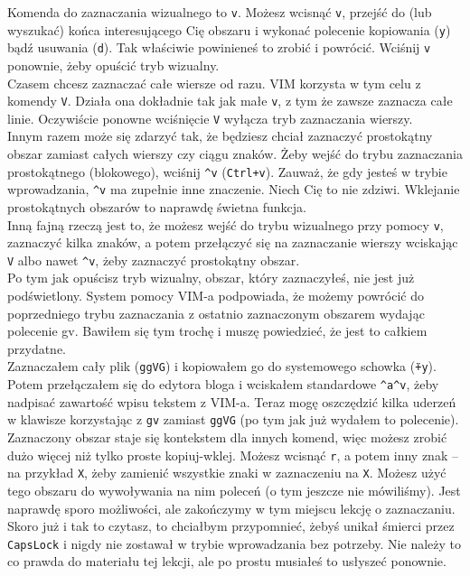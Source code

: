 \documentclass[a4paper,12pt]{article}
\begin{document}
\noindent
Komenda do zaznaczania wizualnego to {\tt v}. Możesz wcisnąć {\tt v}, przejść do (lub wyszukać) końca interesującego Cię obszaru i wykonać polecenie kopiowania ({\tt y}) bądź usuwania ({\tt d}). Tak właściwie powinieneś to zrobić i powrócić. Wciśnij {\tt v} ponownie, żeby opuścić tryb wizualny.\\
Czasem chcesz zaznaczać całe wiersze od razu. VIM korzysta w tym celu z komendy {\tt V}. Działa ona dokładnie tak jak małe {\tt v}, z tym że zawsze zaznacza całe linie. Oczywiście ponowne wciśnięcie {\tt V} wyłącza tryb zaznaczania wierszy.\\
Innym razem może się zdarzyć tak, że będziesz chciał zaznaczyć prostokątny obszar zamiast całych wierszy czy ciągu znaków. Żeby wejść do trybu zaznaczania prostokątnego (blokowego), wciśnij {\tt \^{}v} ({\tt Ctrl+v}). Zauważ, że gdy jesteś w trybie wprowadzania, {\tt \^{}v} ma zupełnie inne znaczenie. Niech Cię to nie zdziwi. Wklejanie prostokątnych obszarów to naprawdę świetna funkcja.\\
Inną fajną rzeczą jest to, że możesz wejść do trybu wizualnego przy pomocy {\tt v}, zaznaczyć kilka znaków, a potem przełączyć się na zaznaczanie wierszy wciskając {\tt V} albo nawet {\tt \^{}v}, żeby zaznaczyć prostokątny obszar.\\
Po tym jak opuścisz tryb wizualny, obszar, który zaznaczyłeś, nie jest już podświetlony. System pomocy VIM-a podpowiada, że możemy powrócić do poprzedniego trybu zaznaczania z ostatnio zaznaczonym obszarem wydając polecenie gv. Bawiłem się tym trochę i muszę powiedzieć, że jest to całkiem przydatne.\\
Zaznaczałem cały plik ({\tt ggVG}) i kopiowałem go do systemowego schowka ({\tt \"{}+y}). Potem przełączałem się do edytora bloga i wciskałem standardowe {\tt \^{}a\^{}v}, żeby nadpisać zawartość wpisu tekstem z VIM-a. Teraz mogę oszczędzić kilka uderzeń w klawisze korzystając z {\tt gv} zamiast {\tt ggVG} (po tym jak już wydałem to polecenie).\\
Zaznaczony obszar staje się kontekstem dla innych komend, więc możesz zrobić dużo więcej niż tylko proste kopiuj-wklej. Możesz wcisnąć {\tt r}, a potem inny znak – na przykład {\tt X}, żeby zamienić wszystkie znaki w zaznaczeniu na {\tt X}. Możesz użyć tego obszaru do wywoływania na nim poleceń (o tym jeszcze nie mówiliśmy). Jest naprawdę sporo możliwości, ale zakończymy w tym miejscu lekcję o zaznaczaniu. \\
Skoro już i tak to czytasz, to chciałbym przypomnieć, żebyś unikał śmierci przez {\tt CapsLock} i nigdy nie zostawał w trybie wprowadzania bez potrzeby. Nie należy to co prawda do materiału tej lekcji, ale po prostu musiałeś to usłyszeć ponownie.
\end{document}
